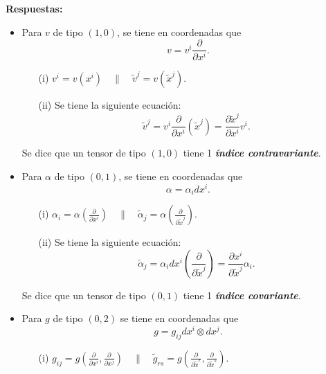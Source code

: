 \noindent\textbf{Respuestas:}
\begin{itemize}
    \item Para $v$ de tipo $(1,0)$, se tiene en coordenadas que
    \begin{equation*}
        v=v^i\frac{\partial}{\partial x^i}.
    \end{equation*}
    \begin{enumerate}
        \item[(i)] $v^i=v(x^i)\quad\|\quad\tilde{v}^j=v(\tilde{x}^j)$.
        \item[(ii)] Se tiene la siguiente ecuaci\'on:
        \begin{equation}
            \tilde{v}^j=v^i\frac{\partial}{\partial x^i}(\tilde{x}^j)=\frac{\partial\tilde{x}^j}{\partial x^i}v^i.
        \end{equation}
    \end{enumerate}
    Se dice que un tensor de tipo $(1,0)$ tiene 1 \textit{\textbf{\'indice contravariante}}.
    \item Para $\alpha$ de tipo $(0,1)$, se tiene en coordenadas que 
    \begin{equation*}
        \alpha=\alpha_idx^i.
    \end{equation*}
    \begin{enumerate}
        \item[(i)] $\alpha_i=\alpha\left(\frac{\partial}{\partial x^i}\right)\quad\|\quad\tilde{\alpha}_j=\alpha\left(\frac{\partial}{\partial\tilde{x}^j}\right)$.
        \item[(ii)] Se tiene la siguiente ecuaci\'on:
        \begin{equation}
            \tilde{\alpha}_j=\alpha_idx^i\left(\frac{\partial}{\partial\tilde{x}^j}\right)=\frac{\partial x^i}{\partial\tilde{x}^j}\alpha_i.
        \end{equation}
    \end{enumerate}
     Se dice que un tensor de tipo $(0,1)$ tiene 1 \textit{\textbf{\'indice covariante}}.
     \item Para $g$ de tipo $(0,2)$ se tiene en coordenadas que 
     \begin{equation*}
         g=g_{ij}dx^i\otimes dx^j.
     \end{equation*}
     \begin{enumerate}
         \item[(i)] $g_{ij}=g\left(\frac{\partial}{\partial x^i},\frac{\partial}{\partial x^j}\right)\quad\|\quad\tilde{g}_{rs}=g\left(\frac{\partial}{\partial\tilde{x}^r},\frac{\partial}{\partial\tilde{x}^s}\right)$.

\end{enumerate}
\end{itemize}
